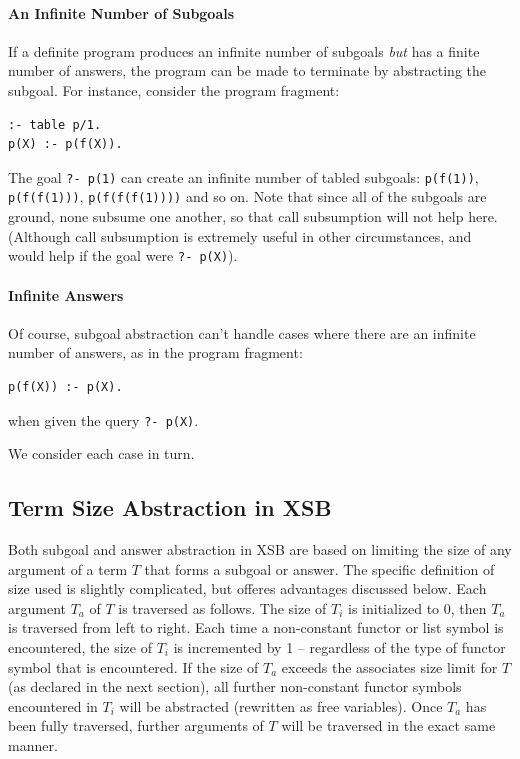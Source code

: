 \paragraph{An Infinite Number of Subgoals}
%
If a definite program produces an infinite number of subgoals {\em
  but} has a finite number of answers, the program can be made to
terminate by abstracting the subgoal.  For instance, consider the
program fragment:
%
\begin{verbatim}
:- table p/1.
p(X) :- p(f(X)).
\end{verbatim}
%
The goal {\tt ?- p(1)} can create an infinite number of tabled
subgoals: {\tt p(f(1))}, {\tt p(f(f(1)))}, {\tt p(f(f(f(1))))} and so
on.  Note that since all of the subgoals are ground, none subsume one
another, so that call subsumption will not help here. (Although call
subsumption is extremely useful in other circumstances, and would help
if the goal were {\tt ?- p(X)}).

\paragraph*{Infinite Answers}
%
Of course, subgoal abstraction can't handle cases where there are an
infinite number of answers, as in the program fragment:
%
\begin{verbatim}
p(f(X)) :- p(X).
\end{verbatim}
%
when given the query {\tt ?- p(X)}.  

We consider each case in turn.

\subsection{Term Size Abstraction in XSB} \label{sec:size-metric}
%
Both subgoal and answer abstraction in XSB are based on limiting the
size of any argument of a term $T$ that forms a subgoal or answer.
The specific definition of size used is slightly complicated, but
offeres advantages discussed below.  Each argument $T_a$ of $T$ is
traversed as follows.  The size of $T_i$ is initialized to 0, then
$T_a$ is traversed from left to right.  Each time a non-constant
functor or list symbol is encountered, the size of $T_i$ is
incremented by 1 -- regardless of the type of functor symbol that is
encountered.  If the size of $T_a$ exceeds the associates size limit
for $T$ (as declared in the next section), all further non-constant
functor symbols encountered in $T_i$ will be abstracted (rewritten as
free variables).  Once $T_a$ has been fully traversed, further
arguments of $T$ will be traversed in the exact same manner.


